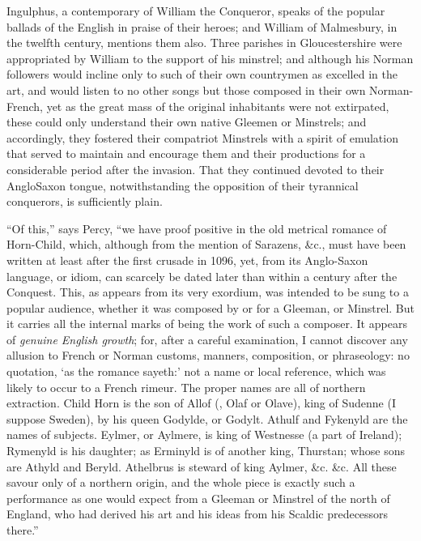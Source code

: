 Ingulphus, a contemporary of William the Conqueror, speaks of the popular
ballads of the English in praise of their heroes; and William of Malmesbury,
in the twelfth century, mentions them also. Three parishes in Gloucestershire
were appropriated by William to the support of his minstrel; and although his
Norman followers would incline only to such of their own countrymen as excelled
in the art, and would listen to no other songs but those composed in their own
Norman-French, yet as the great mass of the original inhabitants were not extirpated,
these could only understand their own native Gleemen or Minstrels; and
accordingly, they fostered their compatriot Minstrels with a spirit of emulation
that served to maintain and encourage them and their productions for a considerable
period after the invasion. That they continued devoted to their AngloSaxon
tongue, notwithstanding the opposition of their tyrannical conquerors, is
sufficiently plain.

“Of this,” says Percy, “we have proof positive in the old metrical romance
of Horn-Child, which, although from the mention of Sarazens, \&c., must have
been written at least after the first crusade in 1096, yet, from its Anglo-Saxon
language, or idiom, can scarcely be dated later than within a century after the
Conquest. This, as appears from its very exordium, was intended to be sung to a
popular audience, whether it was composed by or for a Gleeman, or Minstrel. But
it carries all the internal marks of being the work of such a composer. It appears
of \textit{genuine English growth}; for, after a careful examination, I cannot discover any
allusion to French or Norman customs, manners, composition, or phraseology: no
quotation, ‘as the romance sayeth:’ not a name or local reference, which was
likely to occur to a French rimeur. The proper names are all of northern
extraction. Child Horn is the son of Allof (\ie, Olaf or Olave), king of Sudenne
(I suppose Sweden), by his queen Godylde, or Godylt. Athulf and Fykenyld are
the names of subjects. Eylmer, or Aylmere, is king of Westnesse (a part of
Ireland); Rymenyld is his daughter; as Erminyld is of another king, Thurstan;
whose sons are Athyld and Beryld. Athelbrus is steward of king Aylmer, \&c. \&c.
All these savour only of a northern origin, and the whole piece is exactly such a
performance as one would expect from a Gleeman or Minstrel of the north of
England, who had derived his art and his ideas from his Scaldic predecessors
there.”


